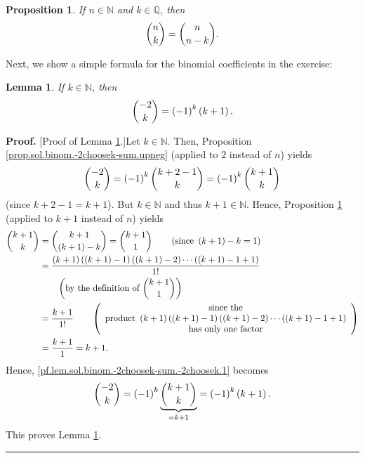 \documentclass[paper=a4, fontsize=12pt]{scrartcl}%
\theoremstyle{plainsl}
\newtheorem{proposition}[theorem]{Proposition}
\newtheorem{lemma}[theorem]{Lemma}
\theoremstyle{definition}
\theoremstyle{remark}
\newenvironment{proof}[1][Proof]{\noindent\textbf{#1.} }{\ \rule{0.5em}{0.5em}}
\begin{document}
\begin{proposition}
\label{prop.sol.binom.-2choosek-sum.sym}If $n\in\mathbb{N}$ and $k\in
\mathbb{Q}$, then
\[
\dbinom{n}{k}=\dbinom{n}{n-k}.
\]

\end{proposition}

Next, we show a simple formula for the binomial coefficients in the exercise:

\begin{lemma}
\label{lem.sol.binom.-2choosek-sum.-2choosek}If $k\in\mathbb{N}$, then%
\[
\dbinom{-2}{k}=\left(  -1\right)  ^{k}\left(  k+1\right)  .
\]

\end{lemma}

\begin{proof}
[Proof of Lemma \ref{lem.sol.binom.-2choosek-sum.-2choosek}.]Let
$k\in\mathbb{N}$. Then, Proposition \ref{prop.sol.binom.-2choosek-sum.upneg}
(applied to $2$ instead of $n$) yields
\begin{equation}
\dbinom{-2}{k}=\left(  -1\right)  ^{k}\dbinom{k+2-1}{k}=\left(  -1\right)
^{k}\dbinom{k+1}{k} \label{pf.lem.sol.binom.-2choosek-sum.-2choosek.1}%
\end{equation}
(since $k+2-1=k+1$). But $k\in\mathbb{N}$ and thus $k+1\in\mathbb{N}$. Hence,
Proposition \ref{prop.sol.binom.-2choosek-sum.sym} (applied to $k+1$ instead
of $n$) yields%
\begin{align*}
\dbinom{k+1}{k}  &  =\dbinom{k+1}{\left(  k+1\right)  -k}=\dbinom{k+1}%
{1}\qquad\left(  \text{since }\left(  k+1\right)  -k=1\right) \\
&  =\dfrac{\left(  k+1\right)  \left(  \left(  k+1\right)  -1\right)  \left(
\left(  k+1\right)  -2\right)  \cdots\left(  \left(  k+1\right)  -1+1\right)
}{1!}\\
&  \qquad\left(  \text{by the definition of }\dbinom{k+1}{1}\right) \\
&  =\dfrac{k+1}{1!}\qquad\left(
\begin{array}
[c]{c}%
\text{since the}\\
\text{product }\left(  k+1\right)  \left(  \left(  k+1\right)  -1\right)
\left(  \left(  k+1\right)  -2\right)  \cdots\left(  \left(  k+1\right)
-1+1\right) \\
\text{has only one factor}%
\end{array}
\right) \\
&  =\dfrac{k+1}{1}=k+1.
\end{align*}
Hence, \eqref{pf.lem.sol.binom.-2choosek-sum.-2choosek.1} becomes
\[
\dbinom{-2}{k}=\left(  -1\right)  ^{k}\underbrace{\dbinom{k+1}{k}}%
_{=k+1}=\left(  -1\right)  ^{k}\left(  k+1\right)  .
\]
This proves Lemma \ref{lem.sol.binom.-2choosek-sum.-2choosek}.
\end{proof}
\end{document}
